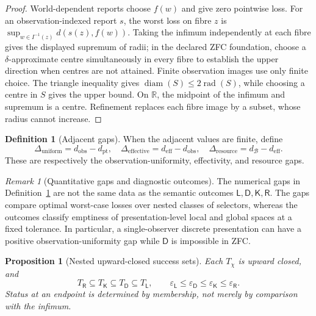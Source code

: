 \documentclass[11pt]{article}
\theoremstyle{plain}
\newtheorem{proposition}[theorem]{Proposition}
\theoremstyle{definition}
\newtheorem{definition}[theorem]{Definition}
\theoremstyle{remark}
\newtheorem{remark}[theorem]{Remark}
\newcommand{\eps}{\varepsilon}
\begin{document}
\begin{proof}
World-dependent reports choose $f(w)$ and give zero pointwise loss. For an
observation-indexed report $s$, the worst loss on fibre $z$ is
$\sup_{w\in I^{-1}(z)}d(s(z),f(w))$. Taking the infimum independently at each
fibre gives the displayed supremum of radii; in the declared ZFC foundation,
choose a $\delta$-approximate centre simultaneously in every fibre to establish
the upper direction when centres are not attained. Finite observation images
use only finite choice. The triangle inequality gives
$\operatorname{diam}(S)\le2\operatorname{rad}(S)$, while choosing a centre in
$S$ gives the upper bound. On $\mathbb R$, the midpoint of the infimum and
supremum is a centre. Refinement replaces each fibre image by a subset, whose
radius cannot increase.
\end{proof}



\begin{definition}[Adjacent gaps]\label{def:tax}
When the adjacent values are finite, define
\[
\Delta_{\mathrm{uniform}}=d_{\mathrm{obs}}-d_{\mathrm{pt}},\quad
\Delta_{\mathrm{effective}}=d_{\mathrm{eff}}-d_{\mathrm{obs}},\quad
\Delta_{\mathrm{resource}}=d_{\mathcal B}-d_{\mathrm{eff}}.
\]
These are respectively the observation-uniformity, effectivity, and resource
gaps.
\end{definition}



\begin{remark}[Quantitative gaps and diagnostic outcomes]
The numerical gaps in Definition~\ref{def:tax} are not the same data as the
semantic outcomes $\mathsf L,\mathsf D,\mathsf K,\mathsf R$. The gaps compare
optimal worst-case losses over nested classes of selectors, whereas the outcomes
classify emptiness of presentation-level local and global spaces at a fixed
tolerance. In particular, a single-observer discrete presentation can have a
positive observation-uniformity gap while $\mathsf D$ is impossible in ZFC.
\end{remark}

\begin{proposition}[Nested upward-closed success sets]\label{prop:spectrum}
Each $T_\chi$ is upward closed, and
\[
T_{\mathsf R}\subseteq T_{\mathsf K}\subseteq
T_{\mathsf D}\subseteq T_{\mathsf L},
\qquad
\eps_{\mathsf L}\le\eps_{\mathsf D}\le
\eps_{\mathsf K}\le\eps_{\mathsf R}.
\]
Status at an endpoint is determined by membership, not merely by comparison with
the infimum.
\end{proposition}
\end{document}
